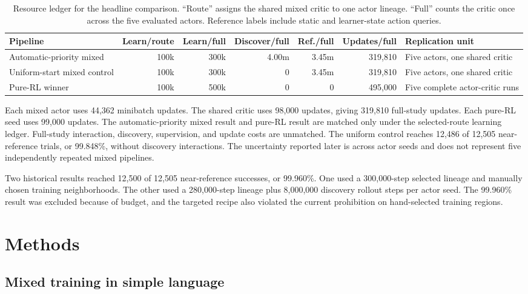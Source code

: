 \documentclass[10pt,twocolumn]{article}
\begin{document}
\begin{table}[t]
\centering
\caption{Resource ledger for the headline comparison. ``Route'' assigns the shared mixed critic to one actor lineage. ``Full'' counts the critic once across the five evaluated actors. Reference labels include static and learner-state action queries.}
\label{tab:resources}
\scriptsize
\begin{tabularx}{\textwidth}{>{\raggedright\arraybackslash}p{27mm}rrrrrX}
\toprule
Pipeline & Learn/route & Learn/full & Discover/full & Ref./full & Updates/full & Replication unit\\
\midrule
Automatic-priority mixed & 100k & 300k & 4.00m & 3.45m & 319,810 & Five actors, one shared critic\\
Uniform-start mixed control & 100k & 300k & 0 & 3.45m & 319,810 & Five actors, one shared critic\\
Pure-RL winner & 100k & 500k & 0 & 0 & 495,000 & Five complete actor-critic runs\\
\bottomrule
\end{tabularx}
\end{table}

Each mixed actor uses 44,362 minibatch updates. The shared critic uses 98,000 updates, giving 319,810 full-study updates. Each pure-RL seed uses 99,000 updates. The automatic-priority mixed result and pure-RL result are matched only under the selected-route learning ledger. Full-study interaction, discovery, supervision, and update costs are unmatched. The uniform control reaches 12,486 of 12,505 near-reference trials, or 99.848\%, without discovery interactions. The uncertainty reported later is across actor seeds and does not represent five independently repeated mixed pipelines.

Two historical results reached 12,500 of 12,505 near-reference successes, or 99.960\%. One used a 300,000-step selected lineage and manually chosen training neighborhoods. The other used a 280,000-step lineage plus 8,000,000 discovery rollout steps per actor seed. The 99.960\% result was excluded because of budget, and the targeted recipe also violated the current prohibition on hand-selected training regions.

\section{Methods}

\subsection{Mixed training in simple language}
\end{document}

